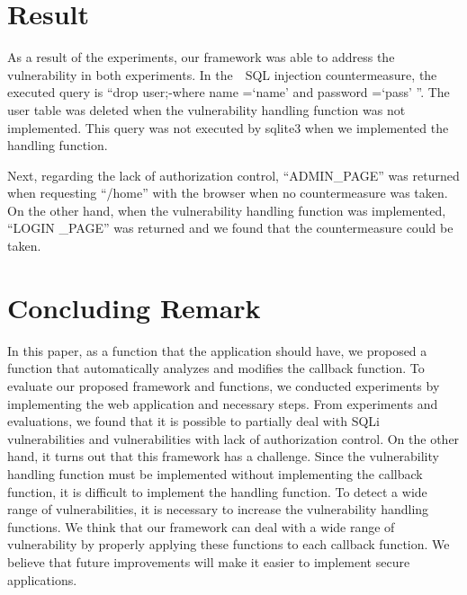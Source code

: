 \documentclass[conference]{IEEEtran}
\begin{document}

\section{Result}
As a result of the experiments, our framework was able to address the vulnerability in both experiments.
In the　SQL injection countermeasure, the executed query is ``drop user;-where name =`name' and password =`pass' ''.
The user table was deleted when the vulnerability handling function was not implemented.
This query was not executed by sqlite3 when we implemented the handling function.

Next, regarding the lack of authorization control, ``ADMIN\_PAGE'' was returned when requesting ``/home'' with the browser when no countermeasure was taken.
On the other hand, when the vulnerability handling function was implemented, ``LOGIN \_PAGE'' was returned and we found that the countermeasure could be taken.

\section{Concluding Remark}
In this paper, as a function that the application should have, we proposed a function that automatically analyzes and modifies the callback function.
To evaluate our proposed framework and functions, we conducted experiments by implementing the web application and necessary steps.
From experiments and evaluations, we found that it is possible to partially deal with SQLi vulnerabilities and vulnerabilities with lack of authorization control.
On the other hand, it turns out that this framework has a challenge.
Since the vulnerability handling function must be implemented without implementing the callback function, it is difficult to implement the handling function.
To detect a wide range of vulnerabilities, it is necessary to increase the vulnerability handling functions.
We think that our framework can deal with a wide range of vulnerability by properly applying these functions to each callback function.
We believe that future improvements will make it easier to implement secure applications.




\end{document}
